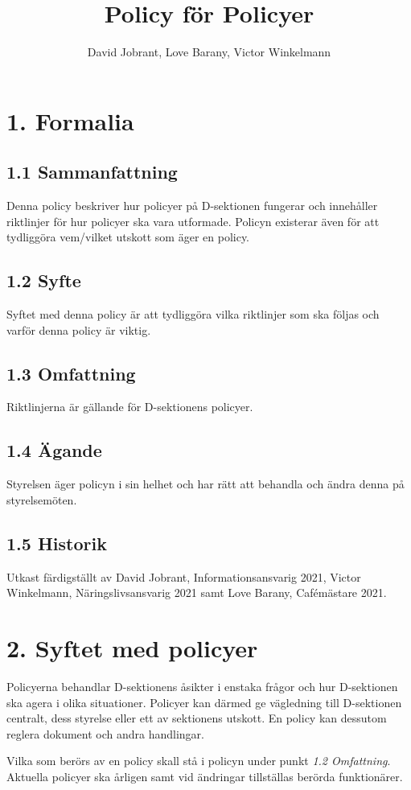 \documentclass[]{dsekkallelse}
\title{Policy för Policyer}
\author{David Jobrant, Love Barany, Victor Winkelmann}
\begin{document}
\section{1. Formalia}
\subsection{1.1 Sammanfattning}
Denna policy beskriver hur policyer på D-sektionen fungerar och innehåller riktlinjer för hur policyer ska vara utformade. Policyn existerar även för att tydliggöra vem/vilket utskott som äger en policy.

\subsection{1.2 Syfte}
Syftet med denna policy är att tydliggöra vilka riktlinjer som ska följas och varför denna policy är viktig.

\subsection{1.3 Omfattning}
Riktlinjerna är gällande för D-sektionens policyer.

\subsection{1.4 Ägande}
Styrelsen äger policyn i sin helhet och har rätt att behandla och ändra denna på styrelsemöten.

\subsection{1.5 Historik}
Utkast färdigställt av David Jobrant, Informationsansvarig 2021, Victor Winkelmann, Näringslivsansvarig 2021 samt Love Barany, Cafémästare 2021.

\section{2. Syftet med policyer}
Policyerna behandlar D-sektionens åsikter i enstaka frågor och hur D-sektionen ska agera i olika situationer. Policyer kan därmed ge vägledning till D-sektionen centralt, dess styrelse eller ett av sektionens utskott. En policy kan dessutom reglera dokument och andra handlingar.

Vilka som berörs av en policy skall stå i policyn under punkt \textit{1.2 Omfattning}. Aktuella policyer ska årligen samt vid ändringar tillställas berörda funktionärer.
\end{document}
